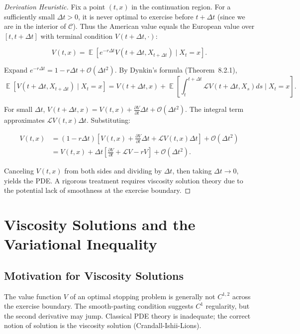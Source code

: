 \documentclass[11pt,a4paper,openany]{book}
\theoremstyle{definition}
\theoremstyle{plain}
\theoremstyle{remark}
\DeclareMathOperator{\E}{\mathbb{E}}
\newcommand{\1}{\mathbbm{1}}
\newcommand{\calL}{\mathcal{L}}
\newcommand{\calC}{\mathcal{C}}
\begin{document}
\begin{proof}[Derivation Heuristic]
Fix a point $(t,x)$ in the continuation region. For a sufficiently small $\Delta t > 0$, it is never optimal to exercise before $t + \Delta t$ (since we are in the interior of $\calC$). Thus the American value equals the European value over $[t, t+\Delta t]$ with terminal condition $V(t+\Delta t, \cdot)$:

\[
V(t,x) = \E\left[e^{-r \Delta t} V(t+\Delta t, X_{t+\Delta t}) \mid X_{t} = x\right].
\]

Expand $e^{-r \Delta t} = 1 - r \Delta t + \mathcal{O}(\Delta t^{2})$. By Dynkin's formula (Theorem~8.2.1),
\[
\E[V(t+\Delta t, X_{t+\Delta t}) \mid X_{t}=x] = V(t+\Delta t, x) + \E\left[\int_{t}^{t+\Delta t} \calL V(t+\Delta t, X_{s}) ds \mid X_{t}=x\right].
\]

For small $\Delta t$, $V(t+\Delta t, x) = V(t,x) + \frac{\partial V}{\partial t} \Delta t + \mathcal{O}(\Delta t^{2})$. The integral term approximates $\calL V(t,x) \Delta t$. Substituting:

\[
\begin{aligned}
V(t,x) &= (1 - r \Delta t) \left[ V(t,x) + \frac{\partial V}{\partial t} \Delta t + \calL V(t,x) \Delta t \right] + \mathcal{O}(\Delta t^{2}) \\
&= V(t,x) + \Delta t \left[ \frac{\partial V}{\partial t} + \calL V - rV \right] + \mathcal{O}(\Delta t^{2}).
\end{aligned}
\]

Canceling $V(t,x)$ from both sides and dividing by $\Delta t$, then taking $\Delta t \to 0$, yields the PDE. A rigorous treatment requires viscosity solution theory due to the potential lack of smoothness at the exercise boundary.
\end{proof}

\chapter{Viscosity Solutions and the Variational Inequality}
\label{ch:viscosity}

\section{Motivation for Viscosity Solutions}

The value function $V$ of an optimal stopping problem is generally not $C^{1,2}$ across the exercise boundary. The smooth-pasting condition suggests $C^{1}$ regularity, but the second derivative may jump. Classical PDE theory is inadequate; the correct notion of solution is the viscosity solution (Crandall-Ishii-Lions).
\end{document}
